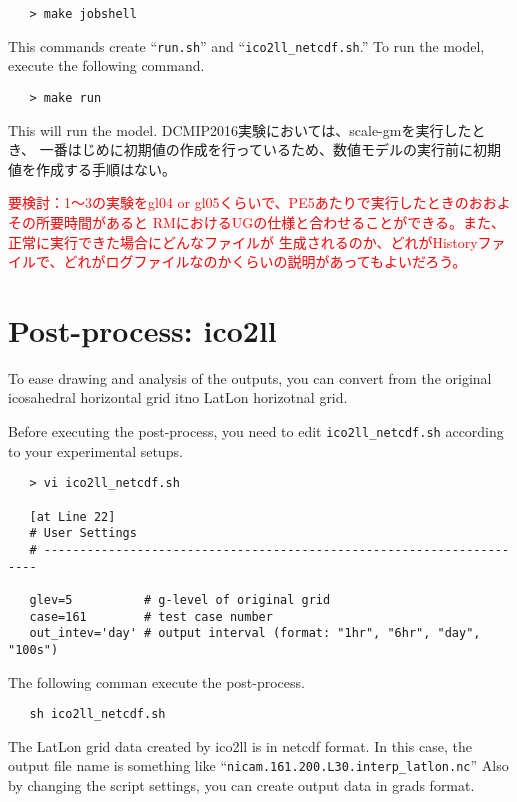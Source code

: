  \begin{verbatim}
   > make jobshell
 \end{verbatim}

This commands create ``\verb|run.sh|'' and ``\verb|ico2ll_netcdf.sh|.''
To run the model, execute the following command.

 \begin{verbatim}
   > make run
 \end{verbatim}

This will run the model.
DCMIP2016実験においては、scale-gmを実行したとき、
一番はじめに初期値の作成を行っているため、数値モデルの実行前に初期値を作成する手順はない。

\textcolor{red}{要検討：1〜3の実験をgl04 or gl05くらいで、PE5あたりで実行したときのおおよその所要時間があると
 RMにおけるUGの仕様と合わせることができる。また、正常に実行できた場合にどんなファイルが
 生成されるのか、どれがHistoryファイルで、どれがログファイルなのかくらいの説明があってもよいだろう。}


\section{Post-process: ico2ll}
To ease drawing and analysis of the outputs, you can convert 
from the original icosahedral horizontal grid itno LatLon horizotnal grid.

Before executing the post-process, you need to edit \verb|ico2ll_netcdf.sh|
according to your experimental setups.
 \begin{verbatim}
   > vi ico2ll_netcdf.sh

   [at Line 22]
   # User Settings
   # ---------------------------------------------------------------------

   glev=5          # g-level of original grid
   case=161        # test case number
   out_intev='day' # output interval (format: "1hr", "6hr", "day", "100s")
 \end{verbatim}

 \noindent The following comman execute the post-process.
 \begin{verbatim}
   sh ico2ll_netcdf.sh
 \end{verbatim}


 \noindent The LatLon grid data created by ico2ll is in netcdf format. 
In this case, the output file name is something like 
``\verb|nicam.161.200.L30.interp_latlon.nc|''
Also by changing the script settings, you can create output data in 
grads format. 
